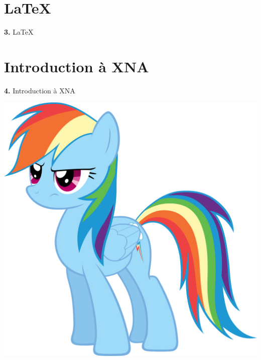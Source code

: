 \documentclass[12pt]{beamer}
\begin{document}
\section{\LaTeX}

\begingroup
{}
\begin{frame}
    \begin{center}
        \vspace{1cm}
        {\Huge\color{background} \textbf{3.} {\selectfont\LaTeX}}
    \end{center}
\end{frame}
\endgroup

\section{Introduction à XNA}

\begin{frame}
    \begin{center}
        \vspace{1cm}

        {\Large \textbf{4.} Introduction à XNA} \\

        \vspace{0.5cm}

        \includegraphics[scale=0.65]{img/rd.png}
    \end{center}
\end{frame}
\end{document}
